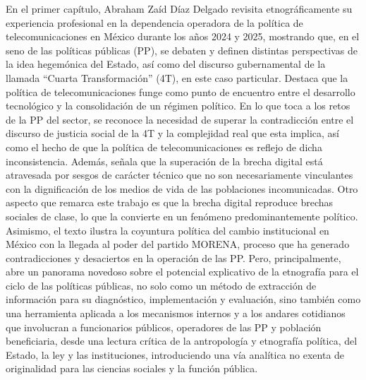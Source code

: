 \documentclass[
  spanish,
  11.5pt,
  170mm x 240mmpaper,
]{scrbook}
\begin{document}
En el primer capítulo, Abraham Zaíd Díaz Delgado revisita
etnográficamente su experiencia profesional en la dependencia operadora
de la política de telecomunicaciones en México durante los años 2024 y
2025, mostrando que, en el seno de las políticas públicas (PP), se
debaten y definen distintas perspectivas de la idea hegemónica del
Estado, así como del discurso gubernamental de la llamada ``Cuarta
Transformación'' (4T), en este caso particular. Destaca que la política
de telecomunicaciones funge como punto de encuentro entre el desarrollo
tecnológico y la consolidación de un régimen político. En lo que toca a
los retos de la PP del sector, se reconoce la necesidad de superar la
contradicción entre el discurso de justicia social de la 4T y la
complejidad real que esta implica, así como el hecho de que la política
de telecomunicaciones es reflejo de dicha inconsistencia. Además, señala
que la superación de la brecha digital está atravesada por sesgos de
carácter técnico que no son necesariamente vinculantes con la
dignificación de los medios de vida de las poblaciones incomunicadas.
Otro aspecto que remarca este trabajo es que la brecha digital reproduce
brechas sociales de clase, lo que la convierte en un fenómeno
predominantemente político. Asimismo, el texto ilustra la coyuntura
política del cambio institucional en México con la llegada al poder del
partido MORENA, proceso que ha generado contradicciones y desaciertos en
la operación de las PP. Pero, principalmente, abre un panorama novedoso
sobre el potencial explicativo de la etnografía para el ciclo de las
políticas públicas, no solo como un método de extracción de información
para su diagnóstico, implementación y evaluación, sino también como una
herramienta aplicada a los mecanismos internos y a los andares
cotidianos que involucran a funcionarios públicos, operadores de las PP
y población beneficiaria, desde una lectura crítica de la antropología y
etnografía política, del Estado, la ley y las instituciones,
introduciendo una vía analítica no exenta de originalidad para las
ciencias sociales y la función pública.
\end{document}
